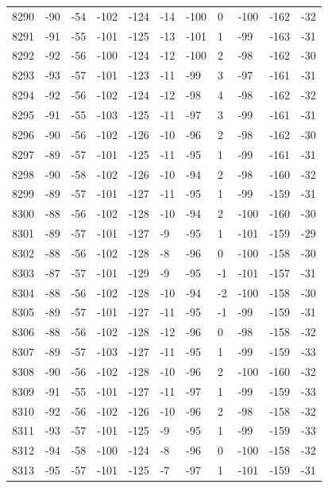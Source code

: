 \begin{table}[H]
\begin{tabular}{lllllllllll}
8290 & -90 & -54 & -102 & -124 & -14 & -100 & 0 & -100 & -162 & -32 \\
8291 & -91 & -55 & -101 & -125 & -13 & -101 & 1 & -99 & -163 & -31 \\
8292 & -92 & -56 & -100 & -124 & -12 & -100 & 2 & -98 & -162 & -30 \\
8293 & -93 & -57 & -101 & -123 & -11 & -99 & 3 & -97 & -161 & -31 \\
8294 & -92 & -56 & -102 & -124 & -12 & -98 & 4 & -98 & -162 & -32 \\
8295 & -91 & -55 & -103 & -125 & -11 & -97 & 3 & -99 & -161 & -31 \\
8296 & -90 & -56 & -102 & -126 & -10 & -96 & 2 & -98 & -162 & -30 \\
8297 & -89 & -57 & -101 & -125 & -11 & -95 & 1 & -99 & -161 & -31 \\
8298 & -90 & -58 & -102 & -126 & -10 & -94 & 2 & -98 & -160 & -32 \\
8299 & -89 & -57 & -101 & -127 & -11 & -95 & 1 & -99 & -159 & -31 \\
8300 & -88 & -56 & -102 & -128 & -10 & -94 & 2 & -100 & -160 & -30 \\
8301 & -89 & -57 & -101 & -127 & -9 & -95 & 1 & -101 & -159 & -29 \\
8302 & -88 & -56 & -102 & -128 & -8 & -96 & 0 & -100 & -158 & -30 \\
8303 & -87 & -57 & -101 & -129 & -9 & -95 & -1 & -101 & -157 & -31 \\
8304 & -88 & -56 & -102 & -128 & -10 & -94 & -2 & -100 & -158 & -30 \\
8305 & -89 & -57 & -101 & -127 & -11 & -95 & -1 & -99 & -159 & -31 \\
8306 & -88 & -56 & -102 & -128 & -12 & -96 & 0 & -98 & -158 & -32 \\
8307 & -89 & -57 & -103 & -127 & -11 & -95 & 1 & -99 & -159 & -33 \\
8308 & -90 & -56 & -102 & -128 & -10 & -96 & 2 & -100 & -160 & -32 \\
8309 & -91 & -55 & -101 & -127 & -11 & -97 & 1 & -99 & -159 & -33 \\
8310 & -92 & -56 & -102 & -126 & -10 & -96 & 2 & -98 & -158 & -32 \\
8311 & -93 & -57 & -101 & -125 & -9 & -95 & 1 & -99 & -159 & -33 \\
8312 & -94 & -58 & -100 & -124 & -8 & -96 & 0 & -100 & -158 & -32 \\
8313 & -95 & -57 & -101 & -125 & -7 & -97 & 1 & -101 & -159 & -31 \\

\end{tabular}
\end{table}
